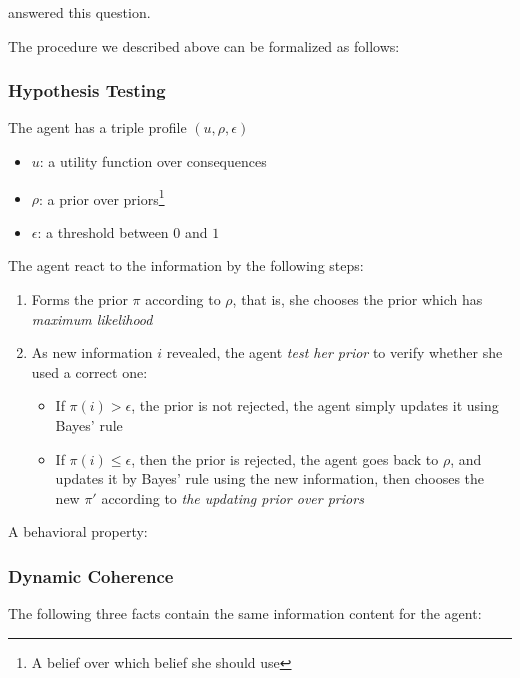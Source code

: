 \documentclass[12pt,letterpaper]{article}
\theoremstyle{definition}   %
\begin{document}
\cite{ortoleva2012modeling} answered this question.

\vspace{0.4cm}

The procedure we described above can be formalized as follows:

\subsubsection*{Hypothesis Testing}


The agent has a triple profile $(u, \rho, \epsilon)$
\begin{itemize}
    \item $u$: a utility function over consequences
    \item $\rho$: a prior over priors\footnote{A belief over which belief she should use}
    \item $\epsilon$: a threshold between $0$ and $1$
\end{itemize}

The agent react to the information by the following steps:

\begin{enumerate}
    \item Forms the prior $\pi$ according to $\rho$, that is, she chooses the prior which has \emph{maximum likelihood}
    \item As new information $i$ revealed, the agent \emph{test her prior} to verify whether she used a correct one:
    \begin{itemize}
        \item If $\pi(i) > \epsilon$, the prior is not rejected, the agent simply updates it using Bayes' rule
        \item If $\pi(i) \leq \epsilon$, then the prior is rejected, the agent goes back to $\rho$, and updates it by Bayes' rule using the new information, then chooses the new $\pi'$ according to \emph{the updating prior over priors}
    \end{itemize}
\end{enumerate}

\vspace{0.4cm}

A behavioral property:

\subsubsection*{Dynamic Coherence}

The following three facts contain the same information content for the agent: 
\end{document}
